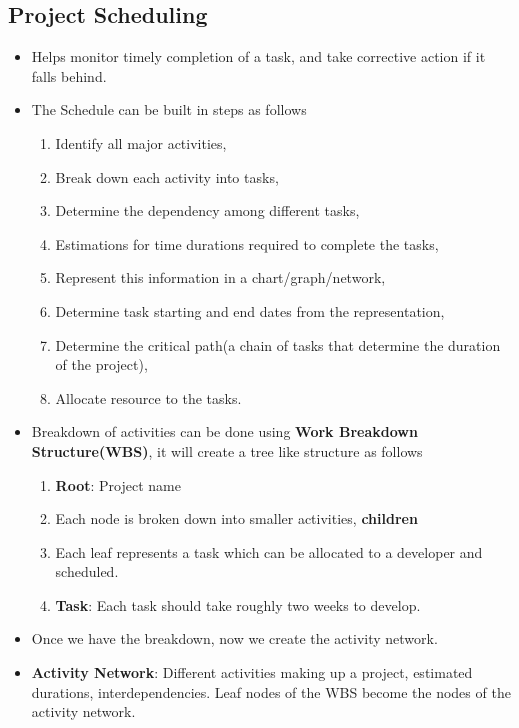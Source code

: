 \documentclass[a4paper]{article}
\begin{document}
\subsection{Project Scheduling}
\begin{itemize}
    \item Helps monitor timely completion of a task, and take corrective action if it falls behind.
    \item The Schedule can be built in steps as follows
    \begin{enumerate}
        \item Identify all major activities,
        \item Break down each activity into tasks,
        \item Determine the dependency among different tasks,
        \item Estimations for time durations required to complete the tasks,
        \item Represent this information in a chart/graph/network,
        \item Determine task starting and end dates from the representation,
        \item Determine the critical path(a chain of tasks that determine the duration of the project),
        \item Allocate resource to the tasks.
    \end{enumerate}
    \item Breakdown of activities can be done using \textbf{Work Breakdown Structure(WBS)}, it will create a tree like structure as follows
    \begin{enumerate}
        \item \textbf{Root}: Project name
        \item Each node is broken down into smaller activities, \textbf{children}
        \item Each leaf represents a task which can be allocated to a developer and scheduled.
        \item \textbf{Task}: Each task should take roughly two weeks to develop.
    \end{enumerate}
    \item Once we have the breakdown, now we create the activity network.
    \item \textbf{Activity Network}: Different activities making up a project, estimated durations, interdependencies. Leaf nodes of the WBS become the nodes of the activity network.
    \begin{figure}[H]

\end{figure}
\end{itemize}
\end{document}

